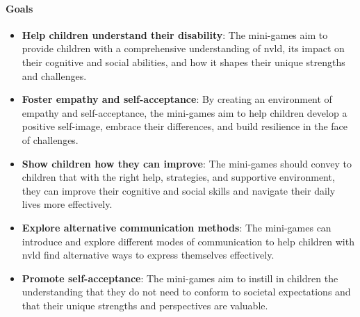 \paragraph{Goals}
\begin{itemize}
    \item \textbf{Help children understand their disability}: The mini-games aim to provide children with a comprehensive understanding of \gls{nvld}, its impact on their cognitive and social abilities, and how it shapes their unique strengths and challenges.
    \item \textbf{Foster empathy and self-acceptance}: By creating an environment of empathy and self-acceptance, the mini-games aim to help children develop a positive self-image, embrace their differences, and build resilience in the face of challenges.
    \item \textbf{Show children how they can improve}: The mini-games should convey to children that with the right help, strategies, and supportive environment, they can improve their cognitive and social skills and navigate their daily lives more effectively.
    \item \textbf{Explore alternative communication methods}: The mini-games can introduce and explore different modes of communication to help children with \gls{nvld} find alternative ways to express themselves effectively.
    \item \textbf{Promote self-acceptance}: The mini-games aim to instill in children the understanding that they do not need to conform to societal expectations and that their unique strengths and perspectives are valuable.
\end{itemize}

